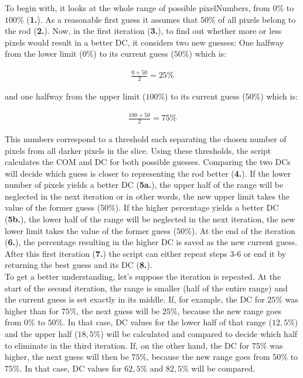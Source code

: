 To begin with, it looks at the whole range of possible pixelNumbers, from $0\%$ to $100\%$ (\textbf{1.}).
As a reasonable first guess it assumes that $50\%$ of all pixels belong to the rod (\textbf{2.}).
Now, in the first iteration (\textbf{3.}), to find out whether more or less pixels would result in a better DC, it considers two new guesses:
One halfway from the lower limit ($0\%$) to its current guess ($50\%$) which is:

\begin{align}
 \frac{0+50}{2}=25\% 
\end{align}

and one halfway from the upper limit ($100\%$) to its current guess ($50\%$) which is:
 
\begin{align}
 \frac{100+50}{2}=75\%
\end{align}


This numbers correspond to a threshold each separating the chosen number of pixels from all darker pixels in the slice.
Using these thresholds, the script calculates the COM and DC for both possible guesses.
Comparing the two DCs will decide which guess is closer to representing the rod better (\textbf{4.}).
If the lower number of pixels yields a better DC (\textbf{5a.}), the upper half of the range will be neglected in the next iteration or in other words, the new upper limit takes the value of the former guess ($50\%$).
If the higher percentage yields a better DC (\textbf{5b.}), the lower half of the range will be neglected in the next iteration, the new lower limit takes the value of the former guess ($50\%$).
At the end of the iteration (\textbf{6.}), the percentage resulting in the higher DC is saved as the new current guess.
After this first iteration (\textbf{7.}) the script can either repeat steps 3-6 or end it by returning the best guess and its DC (\textbf{8.}).\\

To get a better understanding, let's suppose the iteration is repeated.
At the start of the second iteration, the range is smaller (half of the entire range) and the current guess is set exactly in its middle.
If, for example, the DC for $25\%$ was higher than for $75\%$, the next guess will be $25\%$, because the new range goes from $0\%$ to $50\%$.
In that case, DC values for the lower half of that range ($12,5\%$) and the upper half ($18,5\%$) will be calculated and compared to decide which half to eliminate in the third iteration.
If, on the other hand, the DC for $75\%$ was higher, the next guess will then be $75\%$, because the new range goes from $50\%$ to $75\%$.
In that case, DC values for $62,5\%$ and $82,5\%$ will be compared.


